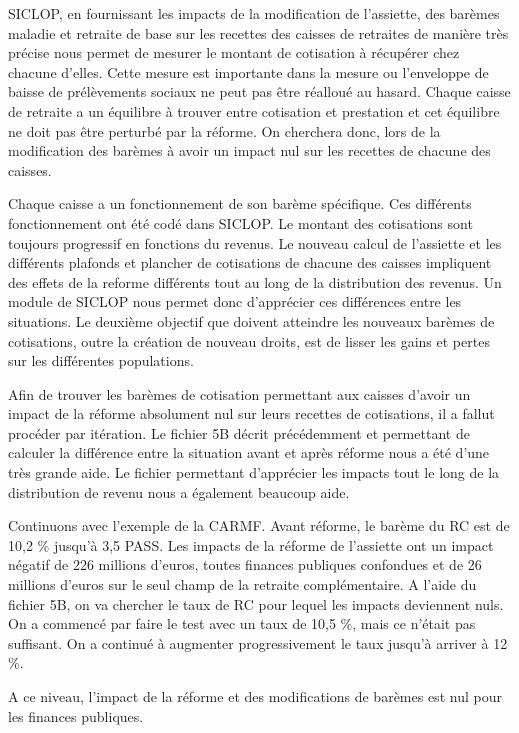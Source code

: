 SICLOP, en fournissant les impacts de la modification de l'assiette, des barèmes maladie et retraite de base sur les recettes des caisses de retraites de manière très précise nous permet de mesurer le montant de cotisation à récupérer chez chacune d'elles. Cette mesure est importante dans la mesure ou l'enveloppe de baisse de prélèvements sociaux ne peut pas être réalloué au hasard. Chaque caisse de retraite a un équilibre à trouver entre cotisation et prestation et cet équilibre ne doit pas être perturbé par la réforme. On cherchera donc, lors de la modification des barèmes à avoir un impact nul sur les recettes de chacune des caisses.

Chaque caisse a un fonctionnement de son barème spécifique. Ces différents fonctionnement ont été codé dans SICLOP. Le montant des cotisations sont toujours progressif en fonctions du revenus. Le nouveau calcul de l'assiette et les différents plafonds et plancher de cotisations de chacune des caisses impliquent des effets de la reforme différents tout au long de la distribution des revenus. Un module de SICLOP nous permet donc d'apprécier ces différences entre les situations.
Le deuxième objectif que doivent atteindre les nouveaux barèmes de cotisations, outre la création de nouveau droits, est de lisser les gains et pertes sur les différentes populations.

Afin de trouver les barèmes de cotisation permettant aux caisses d'avoir un impact de la réforme absolument nul sur leurs recettes de cotisations, il a fallut procéder par itération. Le fichier 5B décrit précédemment et permettant de calculer la différence entre la situation avant et après réforme nous a été d'une très grande aide. Le fichier permettant d'apprécier les impacts tout le long de la distribution de revenu nous a également beaucoup aide.

Continuons avec l'exemple de la CARMF. Avant réforme, le barème du RC est de 10,2 \% jusqu'à 3,5 PASS. 
Les impacts de la réforme de l'assiette ont un impact négatif de 226 millions d'euros, toutes finances publiques confondues et de 26 millions d'euros sur le seul champ de la retraite complémentaire.
A l'aide du fichier 5B, on va chercher le taux de RC pour lequel les impacts deviennent nuls. On a commencé par faire le test avec un taux de 10,5 \%, mais ce n'était pas suffisant. On a continué à augmenter progressivement le taux jusqu'à arriver à 12 \%.

A ce niveau, l'impact de la réforme et des modifications de barèmes est nul pour les finances publiques.

